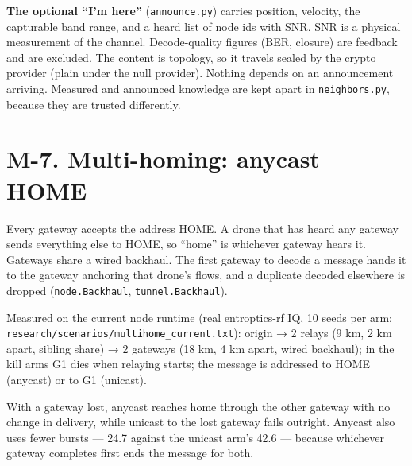 \documentclass[10pt,letterpaper,twocolumn]{article}
\begin{document}
\textbf{The optional ``I'm here''} (\texttt{announce.\allowbreak{}py}) carries position, velocity, the capturable band range, and a heard list of node ids with SNR. SNR is a physical measurement of the channel. Decode-quality figures (BER, closure) are feedback and are excluded. The content is topology, so it travels sealed by the crypto provider (plain under the null provider). Nothing depends on an announcement arriving. Measured and announced knowledge are kept apart in \texttt{neighbors.\allowbreak{}py}, because they are trusted differently.

\section{M-7. Multi-homing: anycast HOME}\label{m-7-multi-homing-anycast-home}

Every gateway accepts the address HOME. A drone that has heard any gateway sends everything else to HOME, so ``home'' is whichever gateway hears it. Gateways share a wired backhaul. The first gateway to decode a message hands it to the gateway anchoring that drone's flows, and a duplicate decoded elsewhere is dropped (\texttt{node.\allowbreak{}Backhaul}, \texttt{tunnel.\allowbreak{}Backhaul}).

Measured on the current node runtime (real entroptics-rf IQ, 10 seeds per arm; \texttt{research/\allowbreak{}scenarios/\allowbreak{}multihome\_\allowbreak{}current.\allowbreak{}txt}): origin → 2 relays (9 km, 2 km apart, sibling share) → 2 gateways (18 km, 4 km apart, wired backhaul); in the kill arms G1 dies when relaying starts; the message is addressed to HOME (anycast) or to G1 (unicast).


With a gateway lost, anycast reaches home through the other gateway with no change in delivery, while unicast to the lost gateway fails outright. Anycast also uses fewer bursts --- 24.7 against the unicast arm's 42.6 --- because whichever gateway completes first ends the message for both.
\end{document}
